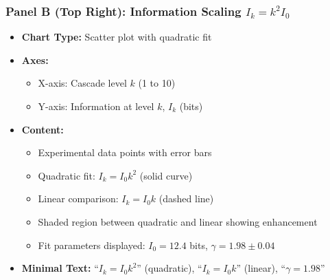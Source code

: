 \subsubsection*{Panel B (Top Right): Information Scaling $I_k = k^2 I_0$}
\begin{itemize}
\item \textbf{Chart Type:} Scatter plot with quadratic fit
\item \textbf{Axes:}
  \begin{itemize}
  \item X-axis: Cascade level $k$ (1 to 10)
  \item Y-axis: Information at level $k$, $I_k$ (bits)
  \end{itemize}
\item \textbf{Content:}
  \begin{itemize}
  \item Experimental data points with error bars
  \item Quadratic fit: $I_k = I_0 k^2$ (solid curve)
  \item Linear comparison: $I_k = I_0 k$ (dashed line)
  \item Shaded region between quadratic and linear showing enhancement
  \item Fit parameters displayed: $I_0 = 12.4$ bits, $\gamma = 1.98 \pm 0.04$
  \end{itemize}
\item \textbf{Minimal Text:} ``$I_k = I_0 k^2$'' (quadratic), ``$I_k = I_0 k$'' (linear), ``$\gamma = 1.98$''
\end{itemize}

